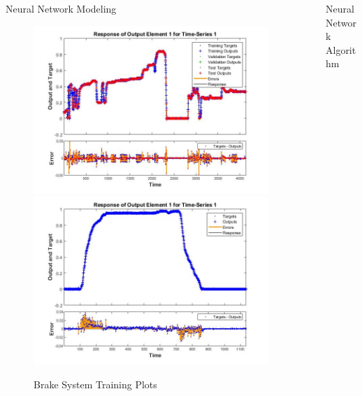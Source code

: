 \documentclass[final]{beamer}
\newlength{\sepwid}
\newlength{\onecolwid}
\begin{document}
\begin{frame}[t]
\begin{columns}[t]
\begin{column}{\onecolwid}
\begin{block}{Neural Network Modeling}
\begin{figure}
    \centering
		{\includegraphics[width=0.48\linewidth]{figs/img/brake_new_neuralNetworkFig}}
		{\includegraphics[width=0.48\linewidth]{figs/img/brake_new_neuralNetworkFigLog2Test}}
	\caption{Brake System Training Plots}
    \label{fig:BrakeSysNeuralNetwork}
\end{figure}


\end{block}



\end{column} %

\begin{column}{\sepwid}\end{column} %

\begin{column}{\onecolwid} %

\begin{block}{Neural Network Algorithm}
\vskip -1cm

 \begin{figure}
  \centering


\end{figure}
\end{block}
\end{column}
\end{columns}
\end{frame}
\end{document}
